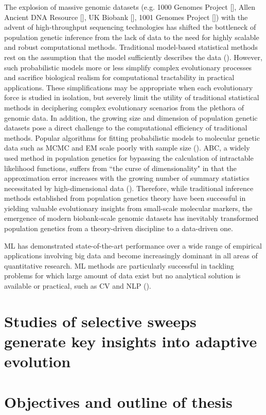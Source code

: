 The explosion of massive genomic datasets (e.g. 1000 Genomes Project [\cite{auton_global_2015}], Allen Ancient DNA Resource [\cite{mallick2023allen}], UK Biobank [\cite{sudlow_uk_2015}], 1001 Genomes Project [\cite{alonso20161}]) with the advent of high-throughput sequencing technologies has shifted the bottleneck of population genetic inference from the lack of data to the need for highly scalable and robust computational methods. Traditional model-based statistical methods rest on the assumption that the model sufficiently describes the data (\cite{schrider_supervised_2018}). However, such probabilistic models more or less simplify complex evolutionary processes and sacrifice biological realism for computational tractability in practical applications. These simplifications may be appropriate when each evolutionary force is studied in isolation, but severely limit the utility of traditional statistical methods in deciphering complex evolutionary scenarios from the plethora of genomic data. In addition, the growing size and dimension of population genetic datasets pose a direct challenge to the computational efficiency of traditional methods. Popular algorithms for fitting probabilistic models to molecular genetic data such as \acf{MCMC} and \ac{EM} scale poorly with sample size (\cite{korfmann_deep_2023}). \Acf{ABC}, a widely used method in population genetics for bypassing the calculation of intractable likelihood functions, suffers from ``the curse of dimensionality" in that the approximation error increases with the growing number of summary statistics necessitated by high-dimensional data (\cite{prangle2018summary}). Therefore, while traditional inference methods established from population genetics theory have been successful in yielding valuable evolutionary insights from small-scale molecular markers, the emergence of modern biobank-scale genomic datasets has inevitably transformed population genetics from a theory-driven discipline to a data-driven one.

\Acf{ML} has demonstrated state-of-the-art performance over a wide range of empirical applications involving big data and become increasingly dominant in all areas of quantitative research. \ac{ML} methods are particularly successful in tackling problems for which large amount of data exist but no analytical solution is available or practical, such as \ac{CV} and \ac{NLP} (\cite{huang_harnessing_2023}).


\section{Studies of selective sweeps generate key insights into adaptive evolution}



\section{Objectives and outline of thesis}
